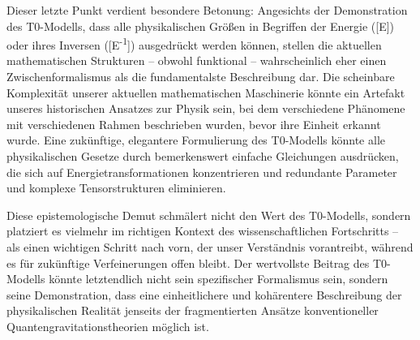 \documentclass[12pt,a4paper]{article}
\begin{document}
	Dieser letzte Punkt verdient besondere Betonung: Angesichts der Demonstration des T0-Modells, dass alle physikalischen Größen in Begriffen der Energie ([E]) oder ihres Inversen ([E\textsuperscript{-1}]) ausgedrückt werden können, stellen die aktuellen mathematischen Strukturen – obwohl funktional – wahrscheinlich eher einen Zwischenformalismus als die fundamentalste Beschreibung dar. Die scheinbare Komplexität unserer aktuellen mathematischen Maschinerie könnte ein Artefakt unseres historischen Ansatzes zur Physik sein, bei dem verschiedene Phänomene mit verschiedenen Rahmen beschrieben wurden, bevor ihre Einheit erkannt wurde. Eine zukünftige, elegantere Formulierung des T0-Modells könnte alle physikalischen Gesetze durch bemerkenswert einfache Gleichungen ausdrücken, die sich auf Energietransformationen konzentrieren und redundante Parameter und komplexe Tensorstrukturen eliminieren.
	
	Diese epistemologische Demut schmälert nicht den Wert des T0-Modells, sondern platziert es vielmehr im richtigen Kontext des wissenschaftlichen Fortschritts – als einen wichtigen Schritt nach vorn, der unser Verständnis vorantreibt, während es für zukünftige Verfeinerungen offen bleibt. Der wertvollste Beitrag des T0-Modells könnte letztendlich nicht sein spezifischer Formalismus sein, sondern seine Demonstration, dass eine einheitlichere und kohärentere Beschreibung der physikalischen Realität jenseits der fragmentierten Ansätze konventioneller Quantengravitationstheorien möglich ist.
	
\end{document}
